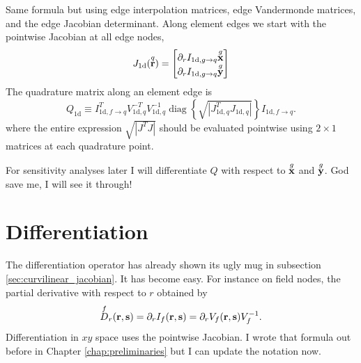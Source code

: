 Same formula but using edge interpolation matrices, edge Vandermonde matrices, and the edge Jacobian determinant.  Along element edges we start with the pointwise Jacobian at all edge nodes,
%
\begin{equation}
J_\textrm{1d}(\overset{q}{\textbf{r}}) =
\begin{bmatrix}
\partial_r I_{\textrm{1d}, g \rightarrow q} \overset{g}{\textbf{x}} \\
\partial_r I_{\textrm{1d}, g \rightarrow q} \overset{g}{\textbf{y}}
\end{bmatrix}
\end{equation}
%
The quadrature matrix along an element edge is
%
\begin{equation}
\boxed{
Q_\textrm{1d} \equiv I_{\textrm{1d}, f \rightarrow q}^T V_{\textrm{1d},q}^{-T} V_{\textrm{1d},q}^{-1} \operatorname{diag} \left\{ \sqrt{|J_{\textrm{1d},q}^T J_{\textrm{1d},q}|} \right\} I_{\textrm{1d},f \rightarrow q}.
}%
\end{equation}
%
where the entire expression $\sqrt{|J^T J|}$ should be evaluated pointwise using $2 \times 1$ matrices at each quadrature point.

For sensitivity analyses later I will differentiate $Q$ with respect to $\overset{g}{\textbf{x}}$ and $\overset{g}{\textbf{y}}$.  God save me, I will see it through!

\section{Differentiation}

The differentiation operator has already shown its ugly mug in subsection \ref{sec:curvilinear_jacobian}.  It has become easy.  For instance on field nodes, the partial derivative with respect to $r$ obtained by
%
\begin{equation}
\overset{f}{D}_r(\textbf{r}, \textbf{s}) = \partial_r I_f(\textbf{r}, \textbf{s}) = \partial_r V_f(\textbf{r}, \textbf{s}) V_f^{-1}.
\end{equation}
%
Differentiation in $xy$ space uses the pointwise Jacobian.  I wrote that formula out before in Chapter \ref{chap:preliminaries} but I can update the notation now.

